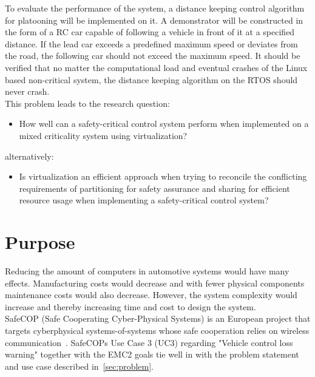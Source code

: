 To evaluate the performance of the system, a distance keeping control algorithm for platooning will be implemented on it. A demonstrator will be constructed in the form of a RC car capable of following a vehicle in front of it at a specified distance. If the lead car exceeds a predefined maximum speed or deviates from the road, the following car should not exceed the maximum speed. %
It should be verified that no matter the computational load and eventual crashes of the Linux based non-critical system, the distance keeping algorithm on the RTOS should never crash.\\ %

This problem leads to the research question: 
\begin{itemize}
\item How well can a safety-critical control system perform when implemented on a mixed criticality system using virtualization?
\end{itemize}
alternatively:

\begin{itemize}
\item Is virtualization an efficient approach when trying to reconcile the conflicting requirements of partitioning for safety assurance and sharing for efficient resource usage when implementing a safety-critical control system?
\end{itemize}

\section{Purpose}
Reducing the amount of computers in automotive systems would have many effects. Manufacturing costs would decrease and with fewer physical components maintenance costs would also decrease. However, the system complexity would increase and thereby increasing time and cost to design the system. \\

SafeCOP (Safe Cooperating Cyber-Physical Systems) is an European project that targets cyberphysical systems-of-systems whose safe cooperation relies on wireless communication~\cite{safecop2016}. SafeCOPs Use Case 3 (UC3) regarding "Vehicle control loss warning" together with the EMC2 goals tie well in with the problem statement and use case described in~\ref{sec:problem}. %

